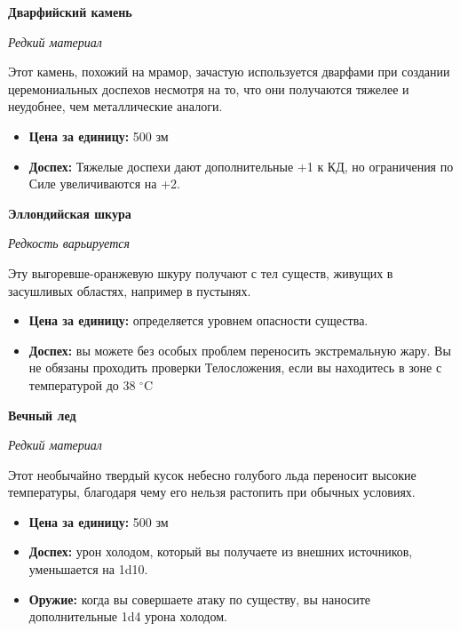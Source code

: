 \documentclass[a4paper, 9pt, twocolumn]{book}
\begin{document}
	\noindent \textbf{Дварфийский камень}
	
	\noindent \textit{Редкий материал}
	
	\smallskip
	
	\noindent Этот камень, похожий на мрамор, зачастую используется дварфами при создании церемониальных доспехов несмотря на то, что они получаются тяжелее и неудобнее, чем металлические аналоги.
	
	\begin{itemize}
		\item \textbf{Цена за единицу:} 500 зм
		
		\item \textbf{Доспех:} Тяжелые доспехи дают дополнительные +1 к КД, но ограничения по Силе увеличиваются на +2.
	\end{itemize}

	\noindent \textbf{Эллондийская шкура}
	
	\noindent \textit{Редкость варьируется}
	
	\smallskip
	
	\noindent Эту выгоревше-оранжевую шкуру получают с тел существ, живущих в засушливых областях, например в пустынях.
	
	\begin{itemize}
		\item \textbf{Цена за единицу:} определяется уровнем опасности существа.
		
		\item \textbf{Доспех:} вы можете без особых проблем переносить экстремальную жару. Вы не обязаны проходить проверки Телосложения, если вы находитесь в зоне с температурой до 38 $^\circ$C
	\end{itemize}

	\noindent \textbf{Вечный лед}
	
	\noindent \textit{Редкий материал}
	
	\smallskip
	
	\noindent Этот необычайно твердый кусок небесно голубого льда переносит высокие температуры, благодаря чему его нельзя растопить при обычных условиях.
	
	\begin{itemize}
		\item \textbf{Цена за единицу:} 500 зм
		
		\item \textbf{Доспех:} урон холодом, который вы получаете из внешних источников, уменьшается на 1d10.
		
		\item \textbf{Оружие:} когда вы совершаете атаку по существу, вы наносите дополнительные 1d4 урона холодом.
	\end{itemize}
\end{document}
